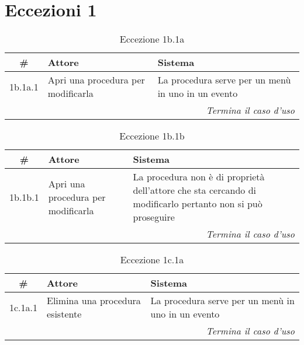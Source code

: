 \section*{Eccezioni 1}
\begin{table}[H]\centering\color{red}\caption*{Eccezione 1b.1a}
      \small
      \begin{tabular}{|c|p{7cm}|p{5.8cm}|}
            \hline\bfseries \# & \bfseries Attore                   & \bfseries Sistema                                  \\\hline
            1b.1a.1            & Apri una procedura per modificarla & La procedura serve per un menù in uno in un evento \\\hline
            \multicolumn{3}{|r|}{\textit{Termina il caso d'uso}}                                                         \\\hline
      \end{tabular}
\end{table}

\begin{table}[H]\centering\color{red}\caption*{Eccezione 1b.1b}
      \small
      \begin{tabular}{|c|p{7cm}|p{5.8cm}|}
            \hline\bfseries \# & \bfseries Attore                   & \bfseries Sistema                                                                                          \\\hline
            1b.1b.1            & Apri una procedura per modificarla & La procedura non è di proprietà dell’attore che sta cercando di modificarlo pertanto non si può proseguire \\\hline
            \multicolumn{3}{|r|}{\textit{Termina il caso d'uso}}                                                                                                                 \\\hline
      \end{tabular}
\end{table}

\begin{table}[H]\centering\color{red}\caption*{Eccezione 1c.1a}
      \small
      \begin{tabular}{|c|p{7cm}|p{5.8cm}|}
            \hline\bfseries \# & \bfseries Attore                & \bfseries Sistema                                  \\\hline
            1c.1a.1            & Elimina una procedura esistente & La procedura serve per un menù in uno in un evento \\\hline
            \multicolumn{3}{|r|}{\textit{Termina il caso d'uso}}                                                      \\\hline
      \end{tabular}
\end{table}

